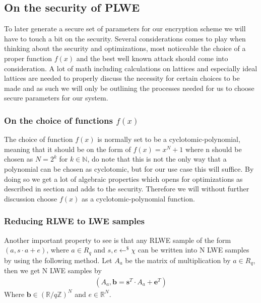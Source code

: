 \documentclass[../main.tex]{subfiles}
\begin{document}
\subsection{On the security of PLWE}
    To later generate a secure set of parameters for our encryption scheme we will have to touch a bit on the security.
    Several considerations comes to play when thinking about the security and optimizations, most noticeable the choice
    of a proper function $f(x)$ and the best well known attack should come into consideration.
    A lot of math including calculations on lattices and especially ideal lattices are needed to properly discuss the
    necessity for certain choices to be made and as such we will only be outlining the processes needed for us to choose
    secure parameters for our system.

    \subsubsection{On the choice of functions $f(x)$}
        The choice of function $f(x)$ is normally set to be a cyclotomic-polynomial, meaning that it should be on the form
        of $f(x) = x^N + 1$ where n should be chosen as $N = 2^k$ for $k \in \mathbb{N}$, do note that this is not the only
        way that a polynomial can be chosen as cyclotomic, but for our use case this will suffice.
        By doing so we get a lot of algebraic properties which opens for optimizations as described in section %
        and adds to the security.
        Therefore we will without further discussion choose $f(x)$ as a cyclotomic-polynomial function.

    \subsubsection{Reducing RLWE to LWE samples}
        Another important property to see is that any RLWE sample of the form $(a, s \cdot a + e)$,
		where $a \in R_q$ and $s, e \leftarrow^\$ \chi$ can be written into N LWE samples by using the following method.
        Let $A_a$ be the matrix of multiplication by $a \in R_q$, then we get N LWE samples by
        \begin{align*}
            (A_a, \textbf{b} = \textbf{s}^T \cdot A_a + \textbf{e}^T)
        \end{align*}
        Where $\textbf{b} \in (\mathbb{R} / q\mathbb{Z})^N$ and $e \in \mathbb{R}^N$.
\end{document}
